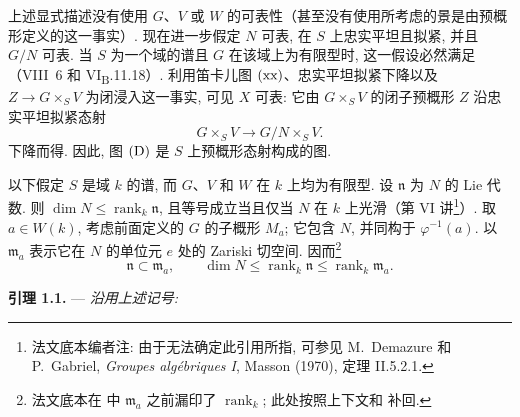 上述显式描述没有使用 \(G\)、\(V\) 或 \(W\) 的可表性（甚至没有使用所考虑的景是由预概形定义的这一事实）. 现在进一步假定 \(N\) 可表, 在 \(S\) 上忠实平坦且拟紧, 并且 \(G/N\) 可表. 当 \(S\) 为一个域的谱且 \(G\) 在该域上为有限型时, 这一假设必然满足（VIII~6 和 VI\textsubscript{B}.11.18）. 利用笛卡儿图 \(\SGARefLink{sga3:xiii:equation:xx}{\mathrm{(xx)}}\)、忠实平坦拟紧下降以及 \(Z\to G\times_S V\) 为闭浸入这一事实, 可见 \(X\) 可表: 它由 \(G\times_S V\) 的闭子预概形 \(Z\) 沿忠实平坦拟紧态射
\[
  G\times_S V\longrightarrow G/N\times_S V.
\]
下降而得. 因此, 图 \(\SGARefLink{sga3:xiii:equation:d}{\mathrm{(D)}}\) 是 \(S\) 上预概形态射构成的图.



以下假定 \(S\) 是域 \(k\) 的谱, 而 \(G\)、\(V\) 和 \(W\) 在 \(k\) 上均为有限型. 设 \(\mathfrak n\) 为 \(N\) 的 Lie 代数. 则 \(\dim N\leq\operatorname{rank}_k\mathfrak n\), 且等号成立当且仅当 \(N\) 在 \(k\) 上光滑（第 VI 讲\footnote{法文底本编者注: 由于无法确定此引用所指, 可参见 M.~Demazure 和 P.~Gabriel, \emph{Groupes algébriques I}, Masson (1970), 定理 II.5.2.1.}）. 取 \(a\in W(k)\), 考虑前面定义的 \(G\) 的子概形 \(M_a\); 它包含 \(N\), 并同构于 \(\varphi^{-1}(a)\). 以 \(\mathfrak m_a\) 表示它在 \(N\) 的单位元 \(e\) 处的 Zariski 切空间. 因而\footnote{法文底本在  中 \(\mathfrak m_a\) 之前漏印了 \(\operatorname{rank}_k\); 此处按照上下文和 补回.}
\[
\tag{1}
  \mathfrak n\subset\mathfrak m_a,\qquad
  \dim N\leq\operatorname{rank}_k\mathfrak n
  \leq\operatorname{rank}_k\mathfrak m_a.
\]

\medskip
\noindent{}\textbf{引理 1.1.} ---
\textit{沿用上述记号:}

